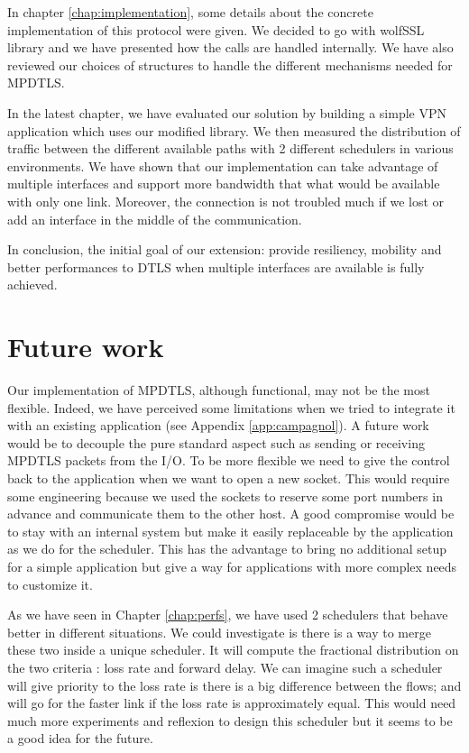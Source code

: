 In chapter \ref{chap:implementation}, some details about the concrete implementation of this protocol were given. We decided to go with wolfSSL library and we have presented how the calls are handled internally. We have also reviewed our choices of structures to handle the different mechanisms needed for MPDTLS.

In the latest chapter, we have evaluated our solution by building a simple VPN application which uses our modified library. We then measured the distribution of traffic between the different available paths with 2 different schedulers in various environments. We have shown that our implementation can take advantage of multiple interfaces and support more bandwidth that what would be available with only one link. Moreover, the connection is not troubled much if we lost or add an interface in the middle of the communication.

In conclusion, the initial goal of our extension: provide resiliency, mobility and better performances to DTLS when multiple interfaces are available is fully achieved.



\section{Future work}

Our implementation of MPDTLS, although functional, may not be the most flexible. Indeed, we have perceived some limitations when we tried to integrate it with an existing application (see Appendix \ref{app:campagnol}). A future work would be to decouple the pure standard aspect such as sending or receiving MPDTLS packets from the I/O. To be more flexible we need to give the control back to the application when we want to open a new socket. This would require some engineering because we used the sockets to reserve some port numbers in advance and communicate them to the other host. A good compromise would be to stay with an internal system but make it easily replaceable by the application as we do for the scheduler. This has the advantage to bring no additional setup for a simple application but give a way for applications with more complex needs to customize it.

As we have seen in Chapter \ref{chap:perfs}, we have used 2 schedulers that behave better in different situations. We could investigate is there is a way to merge these two inside a unique scheduler. It will compute the fractional distribution on the two criteria : loss rate and forward delay. We can imagine such a scheduler will give priority to the loss rate is there is a big difference between the flows; and will go for the faster link if the loss rate is approximately equal. This would need much more experiments and reflexion to design this scheduler but it seems to be a good idea for the future.

